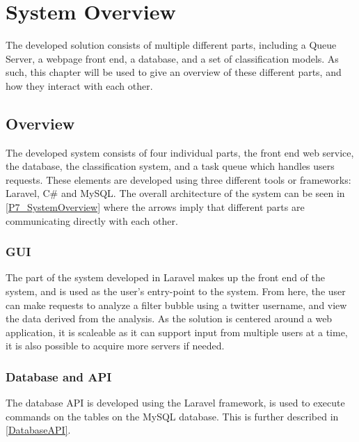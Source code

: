 \chapter{System Overview}\label{ch:sysview}  The developed solution
consists of multiple different parts, including a Queue Server, a webpage front
end, a database, and a set of classification models. As such, this chapter
will be used to give an overview of these different parts, and how they
interact with each other.

\section{Overview}
The developed system consists of four individual parts, the front end web
service, the database, the classification system, and a task queue which handles
users requests. These elements are developed using three different tools or
frameworks: Laravel, C\# and MySQL. The overall architecture of the
system can be seen in \autoref{P7_SystemOverview} where the arrows imply that
different parts are communicating directly with each other.
 



\subsection{GUI} %
The part of the system developed in Laravel makes up the front end of the
system, and is used as the user's entry-point to the system. From here, the
user can make requests to analyze a filter bubble using a twitter username, and
view the data derived from the analysis. As the solution is centered around a web
application, it is scaleable as it can support input from multiple users
at a time, it is also possible to acquire more servers if needed. 

\subsection{Database and API}
The database API is developed using the Laravel framework, is used to execute
commands on the tables on the MySQL database. This is further described in
\autoref{DatabaseAPI}.

